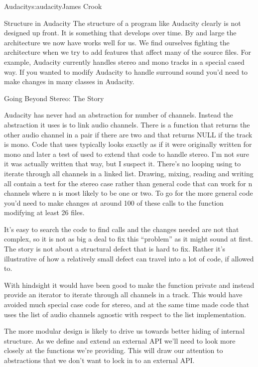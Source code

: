 \begin{aosachapter}{Audacity}{s:audacity}{James Crook}
\begin{aosasect1}{Structure in Audacity}
The structure of a program like Audacity clearly is not designed up
front.  It is something that develops over time.  By and large the
architecture we now have works well for us.  We find ourselves
fighting the architecture when we try to add features that affect many
of the source files.  For example, Audacity currently handles stereo
and mono tracks in a special cased way.  If you wanted to modify
Audacity to handle surround sound you'd need to make changes in many
classes in Audacity.
\newpage %
\begin{aosabox}{Going Beyond Stereo: The  Story}

Audacity has never had an abstraction for number of channels.  Instead
the abstraction it uses is to link audio channels.  There is a
function that returns the other audio channel in a pair
if there are two and that returns NULL if the track is mono.  Code
that uses  typically looks exactly as if it were
originally written for mono and later a test of  used to extend that code to handle stereo.  I'm not sure it
was actually written that way, but I suspect it.  There's no looping
using  to iterate through all channels in a linked list.
Drawing, mixing, reading and writing all contain a test for the stereo
case rather than general code that can work for n channels where n is
most likely to be one or two.  To go for the more general code you'd
need to make changes at around 100 of these calls to the
 function modifying at least 26 files.

It's easy to search the code to find  calls and the
changes needed are not that complex, so it is not as big a deal to fix
this ``problem'' as it might sound at first.  The  story
is not about a structural defect that is hard to fix.  Rather it's
illustrative of how a relatively small defect can travel into a lot of
code, if allowed to.

With hindsight it would have been good to make the 
function private and instead provide an iterator to iterate through
all channels in a track.  This would have avoided much special case code for
stereo, and at the same time made code that uses the
list of audio channels agnostic with respect to the list implementation.

\end{aosabox}

The more modular design is likely to drive us towards better hiding of
internal structure.  As we define and extend an external API we'll
need to look more closely at the functions we're providing.  This will
draw our attention to abstractions that we don't want to lock in to an
external API.


\end{aosasect1}
\end{aosachapter}
